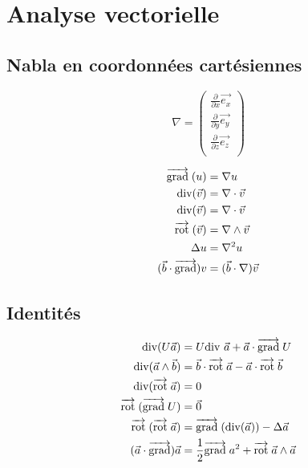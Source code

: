 \documentclass[]{article}
\begin{document}
\section{Analyse vectorielle}

\subsection*{Nabla en coordonnées cartésiennes}

\[ \nabla = \begin{pmatrix}
    \frac{\partial}{\partial x} \vec{e_x} \\
    \frac{\partial}{\partial y} \vec{e_y} \\
    \frac{\partial}{\partial z} \vec{e_z} \\
\end{pmatrix} \]

\begin{align*}
    \overrightarrow{{\text{grad}}} \;(u) &= \nabla u \\
    \text{div}(\vec{v}) &= \nabla \cdot \vec{v} \\
    \text{div}(\vec{v}) &= \nabla \cdot \vec{v}\\
    \overrightarrow{\text{rot}} \;(\vec{v}) &= \nabla \wedge \vec{v}\\
    \Delta u &= \nabla^2 u\\
    (\vec{b}\cdot\overrightarrow{{\text{grad}}})v &= (\vec{b}\cdot\nabla)\vec{v}\\
\end{align*}


\subsection*{Identités}

\begin{align*}
    \text{div}(U \vec{a}) &= U \text{div } \vec{a} + \vec{a} \cdot \overrightarrow{{\text{grad}}} \; U\\
    \text{div}(\vec{a} \wedge \vec{b}) &= \vec{b} \cdot \overrightarrow{\text{rot}} \; \vec{a} - \vec{a} \cdot \overrightarrow{\text{rot}} \; \vec{b}\\
    \text{div}(\overrightarrow{\text{rot}} \; \vec{a}) &= 0\\
    \overrightarrow{\text{rot}} \;(\overrightarrow{{\text{grad}}} \; U) &= \vec{0}\\
    \overrightarrow{\text{rot}} \;(\overrightarrow{\text{rot}} \; \vec{a}) &= \overrightarrow{{\text{grad}}} \;(\text{div}(\vec{a})) - \Delta \vec{a}\\
    (\vec{a}\cdot\overrightarrow{{\text{grad}}})\vec{a} &= \frac{1}{2}\overrightarrow{{\text{grad}}} \; a^2 + \overrightarrow{\text{rot}} \; \vec{a} \wedge \vec{a}\\
\end{align*}
\end{document}
